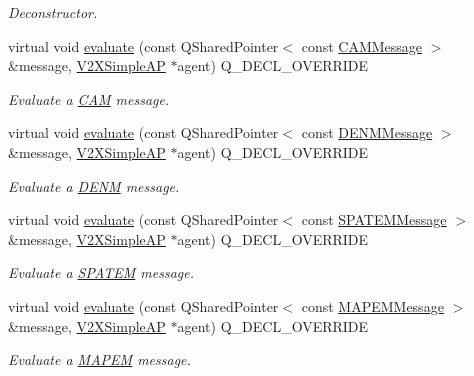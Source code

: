 \begin{DoxyCompactItemize}
\begin{DoxyCompactList}\small\item\em Deconstructor. \end{DoxyCompactList}\item 
virtual void \hyperlink{classFlourishInfrastructureRulesEngine_a1e15fc61fd580562ccb8a16e6b93e907}{evaluate} (const Q\+Shared\+Pointer$<$ const \hyperlink{classCAMMessage}{C\+A\+M\+Message} $>$ \&message, \hyperlink{classV2XSimpleAP}{V2\+X\+Simple\+AP} $\ast$agent) Q\+\_\+\+D\+E\+C\+L\+\_\+\+O\+V\+E\+R\+R\+I\+DE
\begin{DoxyCompactList}\small\item\em Evaluate a \hyperlink{structCAM}{C\+AM} message. \end{DoxyCompactList}\item 
virtual void \hyperlink{classFlourishInfrastructureRulesEngine_a0017d33855e87f9f80211ccd8fd7c183}{evaluate} (const Q\+Shared\+Pointer$<$ const \hyperlink{classDENMMessage}{D\+E\+N\+M\+Message} $>$ \&message, \hyperlink{classV2XSimpleAP}{V2\+X\+Simple\+AP} $\ast$agent) Q\+\_\+\+D\+E\+C\+L\+\_\+\+O\+V\+E\+R\+R\+I\+DE
\begin{DoxyCompactList}\small\item\em Evaluate a \hyperlink{structDENM}{D\+E\+NM} message. \end{DoxyCompactList}\item 
virtual void \hyperlink{classFlourishInfrastructureRulesEngine_a1044d6e57ad05d830f02ba974a8759e5}{evaluate} (const Q\+Shared\+Pointer$<$ const \hyperlink{classSPATEMMessage}{S\+P\+A\+T\+E\+M\+Message} $>$ \&message, \hyperlink{classV2XSimpleAP}{V2\+X\+Simple\+AP} $\ast$agent) Q\+\_\+\+D\+E\+C\+L\+\_\+\+O\+V\+E\+R\+R\+I\+DE
\begin{DoxyCompactList}\small\item\em Evaluate a \hyperlink{structSPATEM}{S\+P\+A\+T\+EM} message. \end{DoxyCompactList}\item 
virtual void \hyperlink{classFlourishInfrastructureRulesEngine_a332ec1445ba5c46257149536da4c51f4}{evaluate} (const Q\+Shared\+Pointer$<$ const \hyperlink{classMAPEMMessage}{M\+A\+P\+E\+M\+Message} $>$ \&message, \hyperlink{classV2XSimpleAP}{V2\+X\+Simple\+AP} $\ast$agent) Q\+\_\+\+D\+E\+C\+L\+\_\+\+O\+V\+E\+R\+R\+I\+DE
\begin{DoxyCompactList}\small\item\em Evaluate a \hyperlink{structMAPEM}{M\+A\+P\+EM} message. \end{DoxyCompactList}\end{DoxyCompactItemize}



